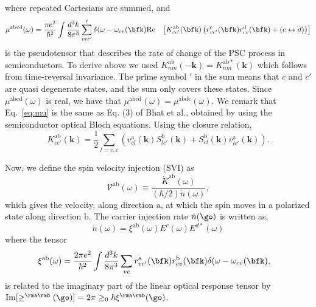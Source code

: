 \documentclass[floatfix,prb,aps,superscriptaddress,showpacs,11pt,preprint,letterpaper]{revtex4}
\begin{document}
where repeated Cartesians are summed, and 
\begin{equation}\label{eq:mu}
\begin{aligned}
\mu^{\mathrm{abcd}}  (\omega) &
=
\frac{\pi e^{2}}{\hbar^{2}} \int 
\frac{d^{3}k}{8 \pi^{3}} \sum'_{vcc'}
  \delta(\omega-\omega_{cv}(\bfk) 
\mathrm{Re} & \left[ K^{\mathrm{ab}}_{cc'}(\bfk) 
\left(  
r^{\mathrm{c}}_{vc'}(\bfk)   
r^{\mathrm{d}}_{cv }(\bfk)  +
(c \leftrightarrow d)  
\right) 
\right]
\end{aligned}
\end{equation} 
is the pseudotensor that describes the rate of change of the  PSC process in
semiconductors. To derive above we used
$
K^{\mathrm{ab}}_{nm}(\mathbf{-k}) = K^{\mathrm{ab*}}_{nm}(\mathbf{k}) 
$
which follows from time-reversal invariance. The prime symbol $'$ in the sum means that
$c$ and $c'$ are quasi degenerate states, and the sum only covers these states.
Since $\mu^{\mathrm{abcd}}(\omega)$ is real, we have that
$\mu^{\mathrm{abcd}}(\omega) =
\mu^{\mathrm{abdc}}(\omega)$. 
We remark that Eq.~\eqref{eq:mu} 
is the same as Eq. (3) of Bhat et al.\cite{bhatPRL05},
obtained by using the semiconductor optical Bloch equations.
Using the closure relation,
\begin{equation}
K^{\mathrm{ab}}_{cc'}(\mathbf{k}) = \frac{1}{2}
\sum_{l=v,c}
\left(v^{\mathrm{a}}_{cl}(\mathbf{k})S^{\mathrm{b}}_{lc'}(\mathbf{k})
+S^{\mathrm{b}}_{cl}(\mathbf{k}) v^{\mathrm{a}}_{lc'}(\mathbf{k})
\right)
.
\label{eq:velspimatelem}
\end{equation}


Now, we define the spin velocity injection (SVI) as
\begin{equation}\label{eq:vab-w}
\mathcal{V}^{\mathrm{ab}}(\omega) \equiv
\frac{\dot{K}^{\mathrm{ab}}(\omega)}{(\hbar/2) \dot{n}(\omega)},
\end{equation}  
which gives the velocity, along direction $\mathrm{a}$, at which the spin
moves in a polarized state along direction $\mathrm{b}$. The carrier injection rate
$\dot n(\go)$ is written as,\cite{nastosPRB05}
\begin{equation}
\dot{n}(\omega) =
\xi^{\mathrm{ab}}(\omega) E^{c }(\omega) E^{d*}(\omega)
\label{eq:dotn}
\end{equation}
where the tensor 
\begin{equation}\label{eq:xi}
\begin{aligned}
\xi^{\mathrm{ab}}(\omega)
&
=
\frac{2\pi e^{2}}{\hbar^{2}} \int 
\frac{d^{3}k}{8 \pi^{3}}
 \sum_{vc}
r^{\mathrm{a}}_{vc'}(\bfk)  
r^{\mathrm{b}}_{cv }(\bfk)  
\delta(\omega-\omega_{cv}(\bfk) 
, 
\end{aligned}
\end{equation}
is related to the imaginary part of the linear optical 
response tensor by
$\mathrm{Im}[\ge^{\rma\rmb}(\go)]=2\pi\ge_0\hbar\xi^{\rma\rmb}(\go)$.
\end{document}
